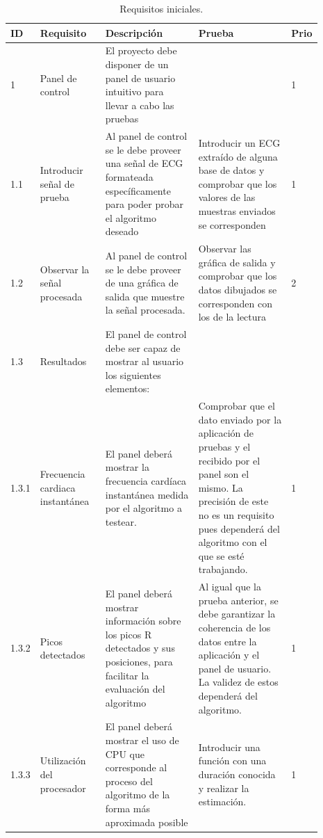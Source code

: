     \begin{scriptsize}
    \begin{longtable}{|p{0.05\linewidth}|p{0.21\linewidth}|p{0.3\linewidth}|p{0.3\linewidth}|p{0.03\linewidth}|}
        \caption{Requisitos iniciales. \label{tab:Requisitos}} \\
        \hline
        ID & Requisito & Descripción & Prueba & Prio \\ \hline
        \endfirsthead
        \endhead
        \hline
        \endfoot
        \endlastfoot
        1 & Panel de control & El proyecto debe disponer de un panel de usuario intuitivo para llevar a cabo las pruebas &  & 1 \\ \hline
        1.1 & Introducir señal de prueba & Al panel de control se le debe proveer una señal de ECG formateada específicamente para poder probar el algoritmo deseado & Introducir un ECG extraído de alguna base de datos y comprobar que los valores de las muestras enviados se corresponden & 1 \\ \hline
        1.2     & Observar la señal procesada & Al panel de control se le debe proveer de una gráfica de salida que muestre la señal procesada. & Observar las gráfica de salida y comprobar que los datos dibujados se corresponden con los de la lectura & 2 \\ \hline 
        1.3     & Resultados & El panel de control debe ser capaz de mostrar al usuario los siguientes elementos: &  &  \\ \hline
        1.3.1   & Frecuencia cardiaca instantánea & El panel deberá mostrar la frecuencia cardíaca instantánea medida por el algoritmo a testear. & Comprobar que el dato enviado por la aplicación de pruebas y el recibido por el panel son el mismo. La precisión de este no es un requisito pues dependerá del algoritmo con el que se esté trabajando. & 1 \\ \hline
        1.3.2   & Picos detectados & El panel deberá mostrar información sobre los picos R detectados y sus posiciones, para facilitar la evaluación del algoritmo & Al igual que la prueba anterior, se debe garantizar la coherencia de los datos entre la aplicación y el panel de usuario. La validez de estos dependerá del algoritmo. & 1 \\ \hline
        1.3.3   & Utilización del procesador & El panel deberá mostrar el uso de CPU que corresponde al proceso del algoritmo de la forma más aproximada posible & Introducir una función con una duración conocida y realizar la estimación. & 1 \\ \hline

\end{longtable}
\end{scriptsize}

